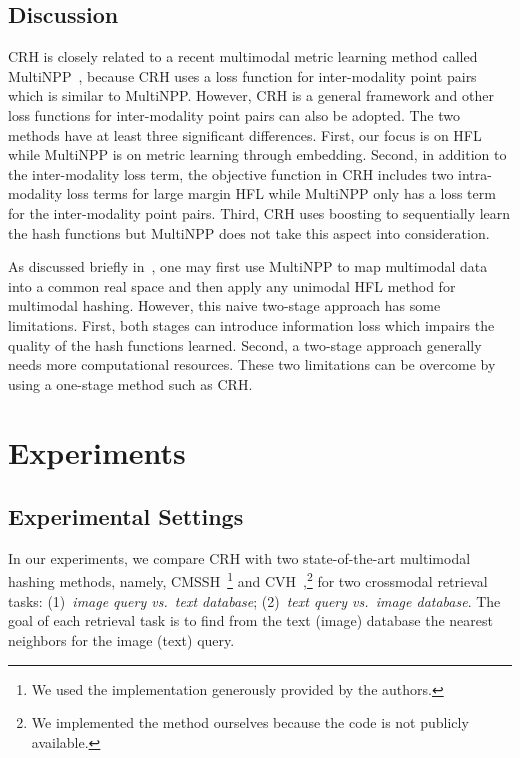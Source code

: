 \subsection{Discussion}
\mbox{CRH} is closely related to a recent multimodal metric learning method called MultiNPP~\cite{quadrianto2011icml}, because \mbox{CRH} uses a loss function for inter-modality point pairs which is similar to MultiNPP. However, \mbox{CRH} is a general framework and other loss functions for inter-modality point pairs can also be adopted. The two methods have at least three significant differences.  First, our focus is on \mbox{HFL} while MultiNPP is on metric learning through embedding. Second, in addition to the inter-modality loss term, the objective function in \mbox{CRH} includes two intra-modality loss terms for large margin HFL while MultiNPP only has a loss term for the inter-modality point pairs.
Third, CRH uses boosting to sequentially learn the hash functions but MultiNPP does not take this aspect into consideration. 

As discussed briefly in~\cite{quadrianto2011icml}, one may first use MultiNPP to map multimodal data into a common real space and then apply any unimodal \mbox{HFL} method for multimodal hashing. However, this naive two-stage approach has some limitations.  First, both stages can introduce information loss which impairs the quality of the hash functions learned.  Second, a two-stage approach generally needs more computational resources.  These two limitations can be overcome by using a one-stage method such as \mbox{CRH}.

\section{Experiments}
\label{crh:exps}

\subsection{Experimental Settings}

In our experiments, we compare \mbox{CRH} with two state-of-the-art multimodal hashing methods, namely, \mbox{CMSSH}~\cite{bronstein2010cvpr}\footnote{We used the implementation generously provided by the authors.} and \mbox{CVH}~\cite{kumar2011ijcai},\footnote{We implemented the method ourselves because the code is not publicly available.} for two crossmodal retrieval tasks: (1)~\textit{image query vs.\ text database}; (2)~\textit{text query vs.\ image database}. The goal of each retrieval task is to find from the text (image) database the nearest neighbors for the image (text) query.

